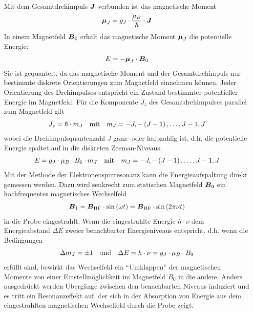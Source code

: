 \documentclass[ngerman]{scrartcl}
\begin{document}
Mit dem Gesamtdrehimpuls $\vb*{J}$ verbunden ist das magnetische Moment
\begin{equation}
    \vb*{\mu}_J = g_J \cdot \frac{\mu_B}{\hbar}\cdot \vb*{J}
\end{equation}
In einem Magnetfeld $\vb*{B}_0$ erhält das magnetische Moment $\vb*{\mu}_J$ die potentielle Energie:
\begin{equation}
    E = - \vb*{\mu}_J \cdot \vb*{B}_0
\end{equation}
Sie ist gequantelt, da das magnetische Moment und der Gesamtdrehimpuls nur bestimmte diskrete Orientierungen zum Magnetfeld einnehmen können. Jeder Orientierung des Drehimpulses entspricht ein Zustand bestimmter potentieller Energie im Magnetfeld. Für die Komponente $J_z$ des Gesamtdrehimpulses parallel zum Magnetfeld gilt
\begin{equation}
    J_z = \hbar \cdot m_J \qq{mit} m_J = -J, -\left(J-1\right), \dots, J-1, J
\end{equation}
wobei die Drehimpulsquantenzahl $J$ ganz- oder halbzahlig ist, d.h. die potentielle Energie spaltet auf in die diskreten Zeeman-Niveaus.
\begin{equation}
    E = g_J \cdot \mu_B \cdot B_0 \cdot m_J \qq{mit} m_J = -J, -\left(J-1\right), \dots, J-1, J
\end{equation}
Mit der Methode der Elektronenspinresonanz kann die Energieaufspaltung direkt gemessen werden. Dazu wird senkrecht zum statischen Magnetfeld $\vb*{B}_0$ ein hochfrequentes magnetisches Wechselfeld
\begin{equation}
    \vb*{B}_1 = \vb*{B}_{\text{HF}} \cdot \sin\left(\omega t\right) = \vb*{B}_{\text{HF}} \cdot \sin\left(2 \pi \nu t\right)
\end{equation}
in die Probe eingestrahlt. Wenn die eingestrahlte Energie $h \cdot \nu$ dem Energieabstand $\Delta E$ zweier benachbarter Energieniveaus entspricht, d.h. wenn die Bedingungen
\begin{equation}
    \label{eq:V}
    \Delta m_J = \pm 1 \qq{und} \Delta E = h \cdot \nu = g_J \cdot \mu_B \cdot B_0
\end{equation}
erfüllt sind, bewirkt das Wechselfeld ein \enquote{Umklappen} der magnetischen Momente von einer Einstellmöglichkeit im Magnetfeld $B_0$ in die andere. Anders ausgedrückt werden Übergänge zwischen den benachbarten Niveaus induziert und es tritt ein Resonanzeffekt auf, der sich in der Absorption von Energie aus dem eingestrahlten magnetischen Wechselfeld durch die Probe zeigt.
%
\end{document}
